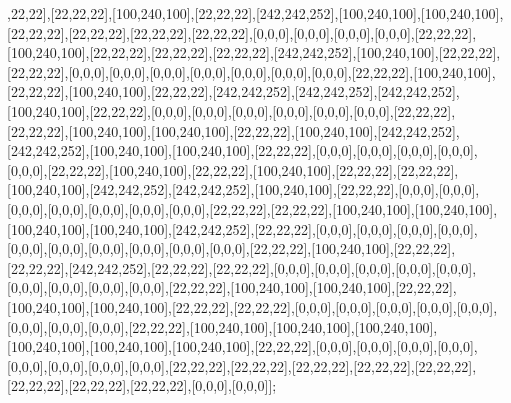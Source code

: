 ,22,22],[22,22,22],[100,240,100],[22,22,22],[242,242,252],[100,240,100],[100,240,100],[22,22,22],[22,22,22],[22,22,22],[22,22,22],[0,0,0],[0,0,0],[0,0,0],[0,0,0],[22,22,22],[100,240,100],[22,22,22],[22,22,22],[22,22,22],[242,242,252],[100,240,100],[22,22,22],[22,22,22],[0,0,0],[0,0,0],[0,0,0],[0,0,0],[0,0,0],[0,0,0],[0,0,0],[22,22,22],[100,240,100],[22,22,22],[100,240,100],[22,22,22],[242,242,252],[242,242,252],[242,242,252],[100,240,100],[22,22,22],[0,0,0],[0,0,0],[0,0,0],[0,0,0],[0,0,0],[0,0,0],[22,22,22],[22,22,22],[100,240,100],[100,240,100],[22,22,22],[100,240,100],[242,242,252],[242,242,252],[100,240,100],[100,240,100],[22,22,22],[0,0,0],[0,0,0],[0,0,0],[0,0,0],[0,0,0],[22,22,22],[100,240,100],[22,22,22],[100,240,100],[22,22,22],[22,22,22],[100,240,100],[242,242,252],[242,242,252],[100,240,100],[22,22,22],[0,0,0],[0,0,0],[0,0,0],[0,0,0],[0,0,0],[0,0,0],[0,0,0],[22,22,22],[22,22,22],[100,240,100],[100,240,100],[100,240,100],[100,240,100],[242,242,252],[22,22,22],[0,0,0],[0,0,0],[0,0,0],[0,0,0],[0,0,0],[0,0,0],[0,0,0],[0,0,0],[0,0,0],[0,0,0],[22,22,22],[100,240,100],[22,22,22],[22,22,22],[242,242,252],[22,22,22],[22,22,22],[0,0,0],[0,0,0],[0,0,0],[0,0,0],[0,0,0],[0,0,0],[0,0,0],[0,0,0],[0,0,0],[22,22,22],[100,240,100],[100,240,100],[22,22,22],[100,240,100],[100,240,100],[22,22,22],[22,22,22],[0,0,0],[0,0,0],[0,0,0],[0,0,0],[0,0,0],[0,0,0],[0,0,0],[0,0,0],[22,22,22],[100,240,100],[100,240,100],[100,240,100],[100,240,100],[100,240,100],[100,240,100],[22,22,22],[0,0,0],[0,0,0],[0,0,0],[0,0,0],[0,0,0],[0,0,0],[0,0,0],[0,0,0],[22,22,22],[22,22,22],[22,22,22],[22,22,22],[22,22,22],[22,22,22],[22,22,22],[22,22,22],[0,0,0],[0,0,0]];

